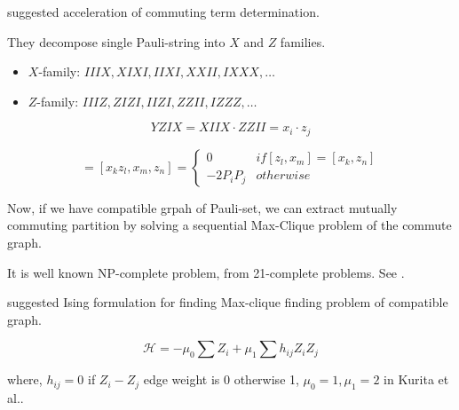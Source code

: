 \documentclass[
11pt,notheorems,hyperref={pdfauthor=Hyunseong Kim}
]{beamer}
\begin{document}
\begin{frame}
    \cite{chapuis_finding_2018} suggested acceleration of commuting term determination. 

    They decompose single Pauli-string into $X$ and $Z$ families. 

    \begin{itemize}
        \item $X$-family: $IIIX, XIXI, IIXI, XXII, IXXX, \dots$
        \item $Z$-family: $IIIZ, ZIZI, IIZI, ZZII, IZZZ, \dots$
    \end{itemize}

    \begin{equation}
        YZIX = XIIX \cdot ZZII = x_i \cdot z_j
    \end{equation}

    \begin{equation}
        [P_i, P_j] = [x_k z_l, x_m, z_n] = 
        \begin{cases} 
            0 & if [z_l, x_m] = [x_k, z_n]\\
            -2P_i P_j & otherwise 
         \end{cases}
    \end{equation}
\end{frame}

\begin{frame}
    Now, if we have compatible grpah of Pauli-set,
    we can extract mutually commuting partition by solving a sequential Max-Clique problem of the commute graph.

    It is well known NP-complete problem, from 21-complete problems. See \cite{Karp1972}. %
    


    \cite{doi:10.1021/acs.jpca.2c06453} suggested Ising formulation for finding Max-clique finding problem of compatible graph.

    \begin{equation}
        \mathcal{H} = - \mu_0 \sum Z_i + \mu_1 \sum h_{ij} Z_i Z_j
    \end{equation}

    where, $h_{ij} = 0$ if $Z_i -Z_j$ edge weight is $0$ otherwise 1, $\mu_0 = 1, \mu_1 =2$ in Kurita et al.. 
\end{frame}
\end{document}
